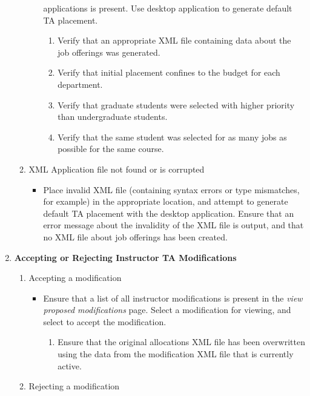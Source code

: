 \documentclass[12pt]{report}
\begin{document}
\begin{enumerate}
\begin{enumerate}
\begin{itemize}
						applications is present. Use desktop application to generate default TA
						placement.
						\begin{enumerate}
							\item Verify that an appropriate XML file containing data about the job
								offerings was generated.
							\item Verify that initial placement confines to the budget for each
								department.
							\item Verify that graduate students were selected with higher priority
								than undergraduate students.
							\item Verify that the same student was selected for as many jobs as
								possible for the same course.
						\end{enumerate}
				\end{itemize}
			\item XML Application file not found or is corrupted
				\begin{itemize}
					\item Place invalid XML file (containing syntax errors or type mismatches, for
						example) in the appropriate location, and attempt to generate default TA
						placement with the desktop application. Ensure that an error message about
						the invalidity of the XML file is output, and that no XML file about job
						offerings has been created.
				\end{itemize}
		\end{enumerate}
	\item \textbf{Accepting or Rejecting Instructor TA Modifications}
		\begin{enumerate}
			\item Accepting a modification
				\begin{itemize}
					\item Ensure that a list of all instructor modifications is present in the
						\textit{view proposed modifications} page. Select a modification for
						viewing, and select to accept the modification.
						\begin{enumerate}
							\item Ensure that the original allocations XML file has been overwritten
								using the data from the modification XML file that is currently
								active.
						\end{enumerate}
				\end{itemize}
			\item Rejecting a modification
				\begin{itemize}

\end{itemize}
\end{enumerate}
\end{enumerate}
\end{document}
